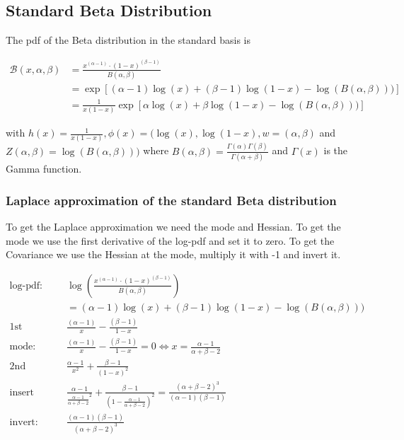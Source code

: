 \subsection{Standard Beta Distribution}

The pdf of the Beta distribution in the standard basis is

\begin{subequations}
\begin{align}
	\mathcal{B}(x, \alpha, \beta) &= \frac{x^{(\alpha - 1)} \cdot (1-x)^{(\beta-1)}}{B(\alpha, \beta)} \\
	 &=  \exp\left[(\alpha-1) \log(x) + (\beta-1)\log(1-x) - \log(B(\alpha,\beta)))\right]\\
	&= \frac{1}{x(1-x)}\exp\left[\alpha\log(x) + \beta\log(1-x) - \log(B(\alpha,\beta)))\right]
\end{align}
\end{subequations}

with $h(x) = \frac{1}{x(1-x)}, \phi(x)=(\log(x), \log(1-x), w = (\alpha, \beta)$ and $Z(\alpha, \beta) = \log(B(\alpha,\beta)))$ where $B(\alpha, \beta) = \frac{\Gamma(\alpha)\Gamma(\beta)}{\Gamma(\alpha + \beta)}$ and $\Gamma(x)$ is the Gamma function.

\subsubsection{Laplace approximation of the standard Beta distribution}

To get the Laplace approximation we need the mode and Hessian. To get the mode we use the first derivative of the log-pdf and set it to zero. To get the Covariance we use the Hessian at the mode, multiply it with -1 and invert it. 

\begin{align*}
\text{log-pdf: } &\log\left( \frac{x^{(\alpha - 1)} \cdot (1-x)^{(\beta-1)}}{B(\alpha, \beta)} \right) \\
&= (\alpha-1) \log(x) + (\beta-1)\log(1-x) - \log(B(\alpha,\beta)))\\
\text{1st derivative: }& \frac{(\alpha-1)}{x} - \frac{(\beta-1)}{1-x}  \\
\text{mode: }& \frac{(\alpha-1)}{x} - \frac{(\beta-1)}{1-x}  = 0 \Leftrightarrow x = \frac{\alpha-1}{\alpha + \beta - 2} \\
\text{2nd derivative: }& \frac{\alpha -1}{x^2} + \frac{\beta - 1}{(1 - x)^2} \\
\text{insert mode: }& \frac{\alpha -1}{\frac{\alpha-1}{\alpha + \beta - 2}^2} + \frac{\beta - 1}{(1 - \frac{\alpha-1}{\alpha + \beta - 2})^2} = \frac{(\alpha + \beta - 2)^3}{(\alpha-1)(\beta-1)}\\
\text{invert: }& \frac{(\alpha -1)(\beta-1)}{(\alpha + \beta - 2)^3}
\end{align*}

